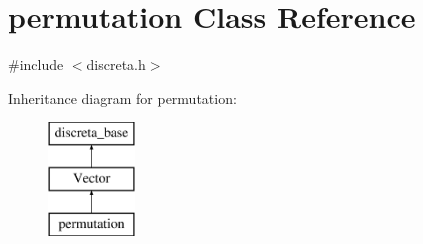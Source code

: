 \hypertarget{classpermutation}{}\section{permutation Class Reference}
\label{classpermutation}


{\ttfamily \#include $<$discreta.\+h$>$}

Inheritance diagram for permutation\+:\begin{figure}[H]
\begin{center}
\leavevmode
\includegraphics[height=3.000000cm]{classpermutation}
\end{center}
\end{figure}
